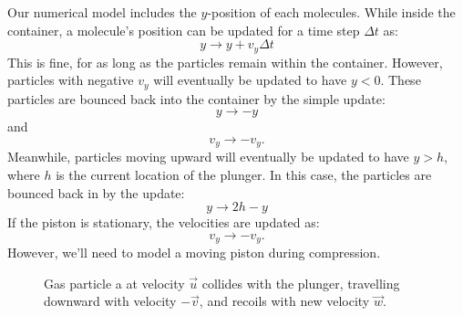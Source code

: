 \documentclass[12pt]{article}
\begin{document}
Our numerical model includes the $y$-position of each molecules.  While inside the container, a molecule's position can be updated for a time step $\Delta t$ as:
$$y \to y + v_y \Delta t$$
This is fine, for as long as the particles remain within the container.  However, particles with negative $v_y$ will eventually be updated to have $y < 0$.  These particles are bounced back into the container by the simple update:
\begin{equation}
y \to -y  
\end{equation}
and
\begin{equation}
v_y \to -v_y.  
\end{equation}
Meanwhile, particles moving upward will eventually be updated to have
$y > h$, where $h$ is the current location of the plunger.  In this case, the particles are bounced back in by the update:
\begin{equation}
y \to 2h - y  
\end{equation}
If the piston is stationary, the velocities are updated as:
\begin{equation}
v_y \to -v_y.  
\end{equation}
However, we'll need to model a moving piston during compression.

\begin{figure}[htbp]
  \begin{center}
    \caption{Gas particle a at velocity $\vec{u}$ collides with the plunger, travelling downward with velocity $-\vec{v}$, and recoils with new velocity $\vec{w}$.}
\label{fig:bounce}
\end{center}
\end{figure}
\end{document}
